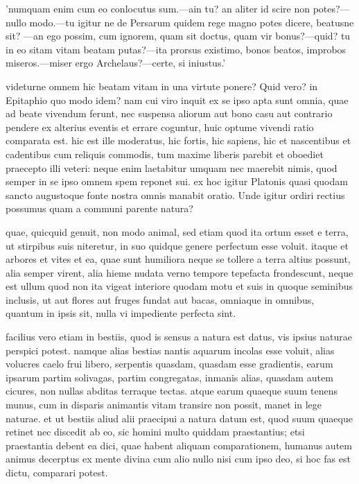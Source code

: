  'numquam enim cum eo conlocutus sum.—ain tu? an aliter id scire non potes?—nullo modo.—tu igitur ne de Persarum quidem rege magno potes dicere, beatusne sit? —an ego possim, cum ignorem, quam sit doctus, quam vir bonus?—quid? tu in eo sitam vitam beatam putas?—ita prorsus existimo, bonos beatos, improbos miseros.—miser ergo Archelaus?—certe, si iniustus.'

 videturne omnem hic beatam vitam in una virtute ponere? Quid vero? in Epitaphio quo modo idem? nam cui viro inquit ex se ipso apta sunt omnia, quae ad beate vivendum ferunt, nec suspensa aliorum aut bono casu aut contrario pendere ex alterius eventis et errare coguntur, huic optume vivendi ratio comparata est. hic est ille moderatus, hic fortis, hic sapiens, hic et nascentibus et cadentibus cum reliquis commodis, tum maxime liberis parebit et oboediet praecepto illi veteri: neque enim laetabitur umquam nec maerebit nimis, quod semper in se ipso omnem spem reponet sui. ex hoc igitur Platonis quasi quodam sancto augustoque fonte nostra omnis manabit oratio. Unde igitur ordiri rectius possumus quam a communi parente natura?

 quae, quicquid genuit, non modo animal, sed etiam quod ita ortum esset e terra, ut stirpibus suis niteretur, in suo quidque genere perfectum esse voluit. itaque et arbores et vites et ea, quae sunt humiliora neque se tollere a terra altius possunt, alia semper virent, alia hieme nudata verno tempore tepefacta frondescunt, neque est ullum quod non ita vigeat interiore quodam motu et suis in quoque seminibus inclusis, ut aut flores aut fruges fundat aut bacas, omniaque in omnibus, quantum in ipsis sit, nulla vi impediente perfecta sint.

 facilius vero etiam in bestiis, quod is sensus a natura est datus, vis ipsius naturae perspici potest. namque alias bestias nantis aquarum incolas esse voluit, alias volucres caelo frui libero, serpentis quasdam, quasdam esse gradientis, earum ipsarum partim solivagas, partim congregatas, inmanis alias, quasdam autem cicures, non nullas abditas terraque tectas. atque earum quaeque suum tenens munus, cum in disparis animantis vitam transire non possit, manet in lege naturae. et ut bestiis aliud alii praecipui a natura datum est, quod suum quaeque retinet nec discedit ab eo, sic homini multo quiddam praestantius; etsi praestantia debent ea dici, quae habent aliquam comparationem, humanus autem animus decerptus ex mente divina cum alio nullo nisi cum ipso deo, si hoc fas est dictu, comparari potest.

